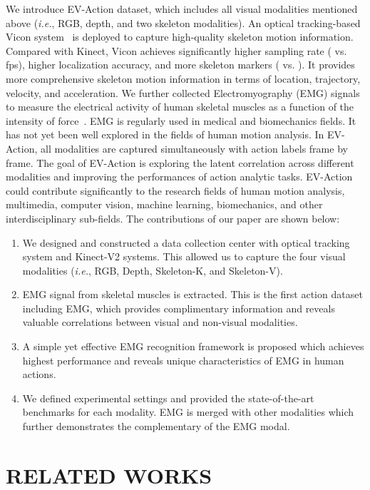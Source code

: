 \documentclass[a4paper, 10pt, conference]{ieeeconf}      \usepackage{FG2020}
\newcommand*\ie{\textit{i.e.}}
\begin{document}
We introduce EV-Action dataset, which includes all visual modalities mentioned above (\ie, RGB, depth, and two skeleton modalities). An optical tracking-based Vicon system~\cite{vicon_VS_kinect1} is deployed to capture high-quality skeleton motion information. Compared with Kinect, Vicon achieves significantly higher sampling rate ( vs.  fps), higher localization accuracy, and more skeleton markers ( vs. ). It provides more comprehensive skeleton motion information in terms of location, trajectory, velocity, and acceleration. We further collected Electromyography (EMG) signals to measure the electrical activity of human skeletal muscles as a function of the intensity of force~\cite{EMG_intro}. EMG is regularly used in medical and biomechanics fields. It has not yet been well explored in the fields of human motion analysis. In EV-Action, all modalities are captured simultaneously with action labels frame by frame. The goal of EV-Action is exploring the latent correlation across different modalities and improving the performances of action analytic tasks. EV-Action could contribute significantly to the research fields of human motion analysis, multimedia, computer vision, machine learning, biomechanics, and other interdisciplinary sub-fields. The contributions of our paper are shown below:
\begin{enumerate}
\item We designed and constructed a data collection center with optical tracking system and Kinect-V2 systems. This allowed us to capture the four visual modalities (\ie, RGB, Depth, Skeleton-K, and Skeleton-V).
\item EMG signal from skeletal muscles is extracted. This is the first action dataset including EMG, which provides complimentary information and reveals valuable correlations between visual and non-visual modalities.
\item A simple yet effective EMG recognition framework is proposed which achieves highest performance and reveals unique characteristics of EMG in human actions.
\item We defined experimental settings and provided the state-of-the-art benchmarks for each modality. EMG is merged with other modalities which further demonstrates the complementary of the EMG modal.
\end{enumerate}


\section{RELATED WORKS}
\end{document}
